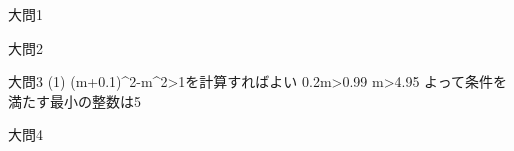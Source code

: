 \documentclass[a4j, 11pt]{jarticle}
\begin{document}
%
大問1
%

%
大問2
%

%
大問3
(1) (m+0.1)^2-m^2>1を計算すればよい
0.2m>0.99
m>4.95
よって条件を満たす最小の整数は5
%

%
大問4
%
\end{document}
